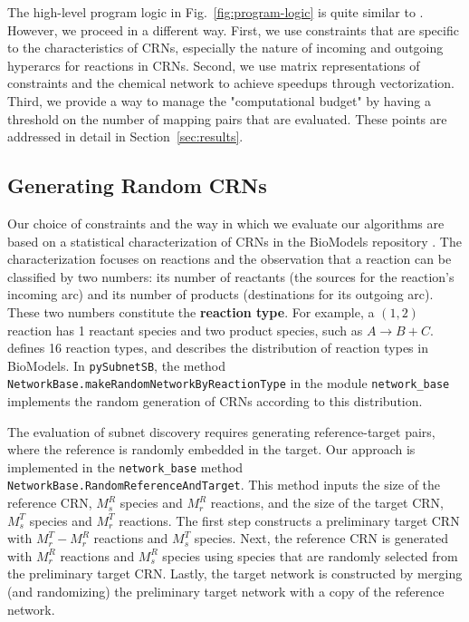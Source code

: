 \documentclass[webpdf,contemporary,large]{oup-authoring-template}
\newcommand{\fig}[1]{
  Fig.~\ref{#1}}
\newcommand{\secref}[1]{Section~\ref{#1}}
\newcommand{\py}{\texttt{pySubnetSB}}
\theoremstyle{thmstyleone}%
\theoremstyle{thmstyletwo}%
\theoremstyle{thmstylethree}%
\begin{document}
The high-level program logic in \fig{fig:program-logic} is quite similar to \citep{yang_hgmatch_2023}.
However, we proceed in a different way.
First, we use constraints that are specific to the characteristics of CRNs,
especially the nature of incoming and outgoing hyperarcs for reactions in CRNs.
Second, we use matrix representations of constraints and the chemical network to achieve speedups through vectorization.
Third, we provide a way to manage the "computational budget" by having a threshold on the number of mapping pairs that are evaluated.
These points are addressed in detail in
\secref{sec:results}.

\subsection{Generating Random CRNs}\label{sec:random-crn}
Our choice of constraints and the way in which we evaluate our algorithms are based on a statistical characterization of CRNs in the
BioModels repository \citep{xu_sbmlkinetics_2023}.
The characterization focuses on reactions and the observation that
a reaction can be classified by two numbers: its number of reactants
(the sources for the reaction's incoming arc)
and its number of products (destinations for its outgoing arc).
These two numbers constitute the {\bf reaction type}.
For example, a $(1, 2)$ reaction has 1 reactant species and two product species, such as $A \rightarrow B + C$.
\citep{xu_sbmlkinetics_2023} defines 16
reaction types, and
describes the distribution of
reaction types in BioModels.
In \py{}, the method
\texttt{NetworkBase}\texttt{.makeRandomNetworkByReactionType}
in the module \texttt{network\_base}
implements the random generation of CRNs according to this distribution.

The evaluation of subnet discovery requires generating reference-target pairs, where the reference is randomly embedded in the target. Our approach is implemented in the 
\texttt{network\_base} method \texttt{NetworkBase.RandomReferenceAndTarget}.
This
method inputs the size of the reference CRN,
$M^R_s$ species and $M^R_r$ reactions, 
and the size of the target CRN,
$M^T_s$ species and $M^T_r$ reactions.
The first step
constructs a
preliminary target CRN with $M^T_r - M^R_r$ reactions and
$M^T_s$ species.
Next,
the reference CRN is generated with
$M^R_r$ reactions and $M^R_s$ species using
species that are
randomly selected from the preliminary target CRN.
Lastly, the target network is constructed by merging (and randomizing) the preliminary target network with a copy of the reference network.
\end{document}

